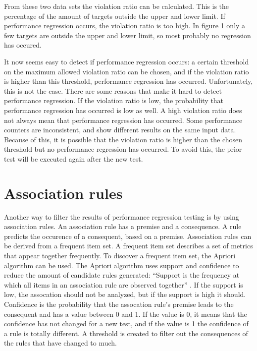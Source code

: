 From these two data sets the violation ratio can be calculated. This is the percentage of the amount of targets outside the upper and lower limit. If performance regression occurs, the violation ratio is too high. In figure 1 only a few targets are outside the upper and lower limit, so most probably no regression has occured.

It now seems easy to detect if performance regression occurs: a certain threshold on the maximum allowed violation ratio can be chosen, and if the violation ratio is higher than this threshold, performance regression has occurred. Unfortunately, this is not the case. There are some reasons that make it hard to detect performance regression. If the violation ratio is low, the probability that performance regression has occurred is low as well. A high violation ratio does not always mean that performance regression has occurred. Some performance counters are inconsistent, and show different results on the same input data. Because of this, it is possible that the violation ratio is higher than the chosen threshold but no performance regression has occurred. To avoid this, the prior test will be executed again after the new test.

\section{Association rules}
Another way to filter the results of performance regression testing is by using association rules. An association rule has a premise and a consequence. A rule predicts the occurence of a consequent, based on a premise. Association rules can be derived from a frequent item set. A frequent item set describes a set of metrics that appear together frequently\cite{foo2010mining}. To discover a frequent item set, the Apriori algorithm can be used. The Apriori algorithm uses support and confidence to reduce the amount of candidate rules generated:
``Support is the frequency at which all items in an association rule are observed together'' \cite{foo2010mining}. If the support is low, the assocation should not be analyzed, but if the support is high it should. Confidence is the probability that the assocation rule's premise leads to the consequent and has a value between 0 and 1. If the value is 0, it means that the confidence has not changed for a new test, and if the value is 1 the confidence of a rule is totally different. A threshold is created to filter out the consequences of the rules that have changed to much.






